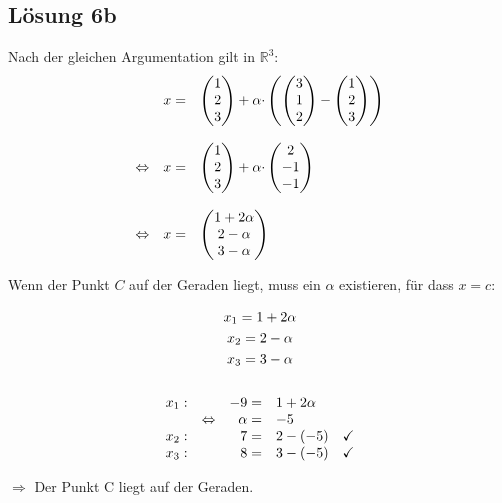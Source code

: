 \subsection{Lösung 6b}
Nach der gleichen Argumentation gilt in $\mathbb{R}^3$:
\begin{gather*}
  \begin{array}{ c r l }
    & x= & \begin{pmatrix}
      1\\
      2\\
      3
    \end{pmatrix} +\alpha \cdotp \left(\begin{pmatrix}
      3\\
      1\\
      2
    \end{pmatrix} -\begin{pmatrix}
      1\\
      2\\
      3
    \end{pmatrix}\right)\\
    \\
    \Leftrightarrow  & x= & \begin{pmatrix}
      1\\
      2\\
      3
    \end{pmatrix} +\alpha \cdotp \begin{pmatrix}
      2\\
      -1\\
      -1
    \end{pmatrix}\\
    \\
    \Leftrightarrow  & x= & \begin{pmatrix}
      1+2\alpha \\
      2-\alpha \\
      3-\alpha 
    \end{pmatrix}
  \end{array}\\
\end{gather*}

Wenn der Punkt $C$ auf der Geraden liegt, muss ein $\alpha$ existieren, für dass $x=c$:

\begin{gather*}
  x_{1} =1+2\alpha \\
  x_{2} =2-\alpha \\
  x_{3} =3-\alpha \\
  \\
  \begin{array}{ l r r l c }
    x_{1} : &  & -9= & 1+2\alpha  & \\
    & \Leftrightarrow  & \alpha = & -5 & \\
    x_{2} : &  & 7= & 2-( -5) & \checkmark \\
    x_{3} : &  & 8= & 3-( -5) & \checkmark 
  \end{array}
\end{gather*}

$\Rightarrow$ Der Punkt C liegt auf der Geraden.